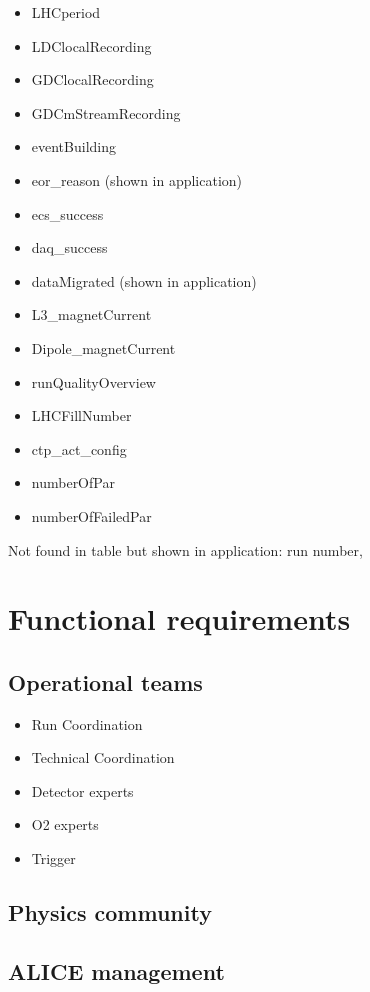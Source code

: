 \begin{itemize}
  \item LHCperiod	
  \item LDClocalRecording	
  \item GDClocalRecording	
  \item GDCmStreamRecording	
  \item eventBuilding	
  \item eor\_reason (shown in application)
  \item ecs\_success	
  \item daq\_success	
  \item dataMigrated (shown in application)
  \item L3\_magnetCurrent	
  \item Dipole\_magnetCurrent	
  \item runQualityOverview	
  \item LHCFillNumber	
  \item ctp\_act\_config	
  \item numberOfPar	
  \item numberOfFailedPar
\end{itemize}
Not found in table but shown in application: run number, 


\section{Functional requirements}

\subsection{Operational teams}
\begin{itemize}
  \item Run Coordination
  \item Technical Coordination
  \item Detector experts
  \item O2 experts
  \item Trigger
\end{itemize}

\subsection{Physics community}

\subsection{ALICE management}

